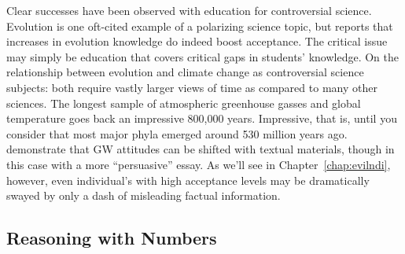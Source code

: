 
Clear successes have been observed with education for controversial science.
Evolution is one oft-cited example of a polarizing science topic, but
\textcite{shtulman_learning_2008} reports that increases in evolution knowledge
do indeed boost acceptance. The critical issue may simply be education that
covers critical gaps in students' knowledge. On the relationship between
evolution and climate change as controversial science subjects: both require
vastly larger views of time as compared to many other sciences. The longest
sample of atmospheric greenhouse gasses and global temperature goes back an
impressive 800,000 years.  Impressive, that is, until you consider that most
major phyla emerged around 530 million years ago.
\textcite{sinatra_promoting_2012} demonstrate that GW attitudes can be shifted
with textual materials, though in this case with a more “persuasive” essay. As
we'll see in Chapter~\ref{chap:evilndi}, however, even individual's with high
acceptance levels may be dramatically swayed by only a dash of misleading
factual information. 

\subsection{Reasoning with Numbers \label{sec:ndi}}


